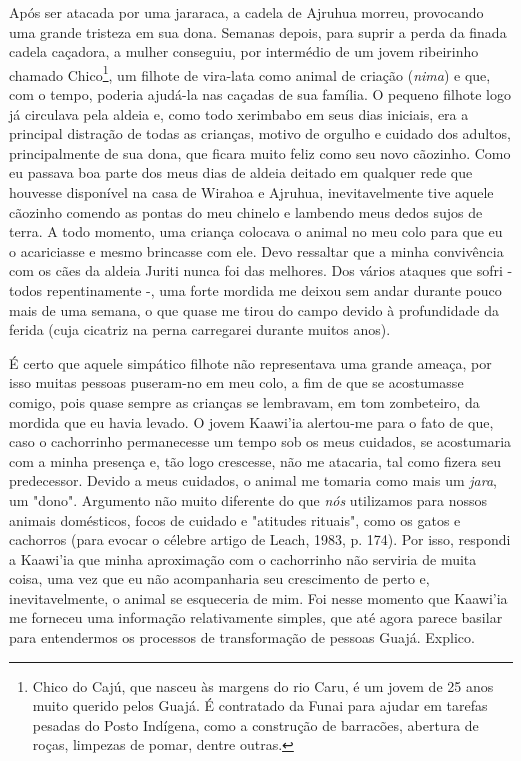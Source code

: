 Após ser atacada por uma jararaca, a cadela de Ajruhua morreu,
provocando uma grande tristeza em sua dona. Semanas depois, para suprir
a perda da finada cadela caçadora, a mulher conseguiu, por intermédio de
um jovem ribeirinho chamado Chico\footnote{Chico do Cajú, que nasceu às
  margens do rio Caru, é um jovem de 25 anos muito querido pelos Guajá.
  É contratado da Funai para ajudar em tarefas pesadas do Posto
  Indígena, como a construção de barracões, abertura de roças, limpezas
  de pomar, dentre outras.}, um filhote de vira-lata como animal de
criação (\emph{nima}) e que, com o tempo, poderia ajudá-la nas caçadas
de sua família. O pequeno filhote logo já circulava pela aldeia e, como
todo xerimbabo em seus dias iniciais, era a principal distração de todas
as crianças, motivo de orgulho e cuidado dos adultos, principalmente de
sua dona, que ficara muito feliz como seu novo cãozinho. Como eu passava
boa parte dos meus dias de aldeia deitado em qualquer rede que houvesse
disponível na casa de Wirahoa e Ajruhua, inevitavelmente tive aquele
cãozinho comendo as pontas do meu chinelo e lambendo meus dedos sujos de
terra. A todo momento, uma criança colocava o animal no meu colo para
que eu o acariciasse e mesmo brincasse com ele. Devo ressaltar que a
minha convivência com os cães da aldeia Juriti nunca foi das melhores.
Dos vários ataques que sofri - todos repentinamente -, uma forte mordida
me deixou sem andar durante pouco mais de uma semana, o que quase me
tirou do campo devido à profundidade da ferida (cuja cicatriz na perna
carregarei durante muitos anos).

É certo que aquele simpático filhote não representava uma grande ameaça,
por isso muitas pessoas puseram-no em meu colo, a fim de que se
acostumasse comigo, pois quase sempre as crianças se lembravam, em tom
zombeteiro, da mordida que eu havia levado. O jovem Kaawi'ia alertou-me
para o fato de que, caso o cachorrinho permanecesse um tempo sob os meus
cuidados, se acostumaria com a minha presença e, tão logo crescesse, não
me atacaria, tal como fizera seu predecessor. Devido a meus cuidados, o
animal me tomaria como mais um \emph{jara}, um "dono". Argumento não
muito diferente do que \emph{nós} utilizamos para nossos animais
domésticos, focos de cuidado e "atitudes rituais", como os gatos e
cachorros (para evocar o célebre artigo de Leach, 1983, p. 174). Por
isso, respondi a Kaawi'ia que minha aproximação com o cachorrinho não
serviria de muita coisa, uma vez que eu não acompanharia seu crescimento
de perto e, inevitavelmente, o animal se esqueceria de mim. Foi nesse
momento que Kaawi'ia me forneceu uma informação relativamente simples,
que até agora parece basilar para entendermos os processos de
transformação de pessoas Guajá. Explico.

